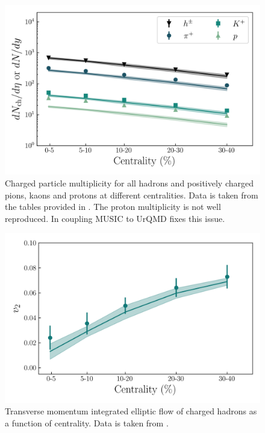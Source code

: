 \begin{figure}[!hbt]
	\includegraphics[width=\textwidth]{images/dn_cent_shear.png}
	\caption{\normalsize Charged particle multiplicity for all hadrons and positively charged pions, kaons and protons at different centralities. Data is taken from the tables provided in \cite{Abelev:2008ab}. The proton multiplicity is not well reproduced. In \cite{ryubulk} coupling {\sffamily MUSIC} to {\sffamily UrQMD} fixes this issue.} 
\end{figure}

\begin{figure}[!hbt]
	\includegraphics[width=\textwidth]{images/vn_cent.png}
	\caption{\normalsize Transverse momentum integrated elliptic flow of charged hadrons as a function of centrality. Data is taken from \cite{Abelev:2008ae}.} 
\end{figure}

